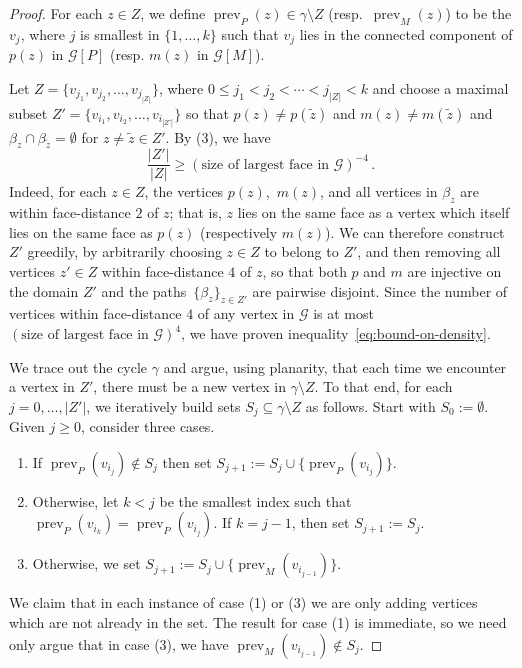 \documentclass{daj}
\newcommand{\G}{\mathcal{G}}
\DeclareMathOperator{\prev}{\mbox{prev}}
\begin{document}
\begin{proof}
	For each $z \in Z$, we define $\prev_P(z) \in \gamma \setminus Z$ (resp.\ $\prev_M(z)$) to be the $v_{j}$, where $j$ is smallest in $\{1, \dots, k\}$ such that $v_{j}$ lies in the connected component of $p(z)$ in $\G[P]$ (resp. $m(z)$ in $\G[M]$).
	
	Let $Z = \{v_{j_1}, v_{j_2}, \dots, v_{j_{|Z|}}\}$, where $0 \leq j_1 < j_2 < \cdots < j_{|Z|} < k$
	and choose a maximal subset $Z' = \{v_{i_1}, v_{i_2}, \dots, v_{i_{|Z'|}}\}$ so that $p(z) \neq p(\tilde z)$ and $m(z) \neq m(\tilde z)$ and $\beta_z \cap \beta_{\tilde z} = \emptyset$ for $z \neq \tilde z \in Z'$.
	By (3), we have
	\begin{equation} \label{eq:bound-on-density}
		\frac{|Z'|}{|Z|} \geq {(\mbox{size of largest face in $\G$})}^{-4} \, .
	\end{equation}
	Indeed, for each $z \in Z$, the vertices $p(z)$,~$m(z)$, and all vertices in $\beta_z$ are within face-distance $2$ of $z$; that is, $z$ lies on the same face as a vertex which itself lies on the same face as $p(z)$ (respectively $m(z)$). We can therefore construct $Z'$ greedily, by arbitrarily choosing $z \in Z$ to belong to $Z'$, and then removing all vertices $z' \in Z$ within face-distance $4$ of $z$, so that both $p$ and $m$ are injective on the domain $Z'$
	and the paths~$\{\beta_z\}_{z \in Z'}$ are pairwise disjoint. Since the number of vertices within face-distance $4$ of any vertex in $\G$ is at most $(\mbox{size of largest face in $\G$})^4$, we have proven inequality~\eqref{eq:bound-on-density}.
	
	We trace out the cycle $\gamma$ and argue, using planarity, that each time we encounter a vertex in $Z'$, there must be a new vertex in $\gamma \setminus Z$.  To that end, for each $j = 0, \dots, |Z'|$, we iteratively build sets $S_j \subseteq \gamma \setminus Z$ as follows. Start with $S_0 := \emptyset$. Given $j \geq 0$, consider three cases.
	\begin{enumerate}
		\item If $\prev_P(v_{i_j}) \not\in S_j$ then set $S_{j+1} := S_j \cup \{\prev_P(v_{i_j})\}$.
		\item Otherwise, let $k < j$ be the smallest index such that $\prev_P(v_{i_k}) = \prev_P(v_{i_j})$. If $k = j-1$, then set $S_{j+1} := S_j$.
		\item Otherwise, we set $S_{j+1} := S_j \cup \{\prev_M(v_{i_{j-1}})\}$.
	\end{enumerate}
	
	We claim that in each instance of case (1) or (3) we are only adding vertices which are not already in the set. The result for case (1) is immediate, so we need only argue that in case (3), we have $\prev_M(v_{i_{j-1}}) \not \in S_j$.
	

\end{proof}
\end{document}
